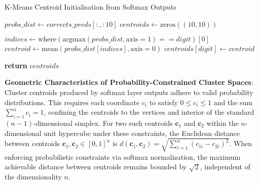 \begin{algorithm}
\caption{K-Means Centroid Initialisation from Softmax Outputs}
\label{alg:k-means-centroid-init} 
\begin{algorithmic}[1]

\State $probs\_dist \gets corrects\_preds[:, :10]$ 
\State $centroids \gets \text{zeros}((10, 10))$ 

\State $indices \gets \text{where}(\text{argmax}(probs\_dist, \text{axis}=1) == digit)[0]$ 
\State $centroid \gets \text{mean}(probs\_dist[indices], \text{axis}=0)$ 
\State $centroids[digit] \gets centroid$ 
\EndFor

\State \textbf{return} $centroids$
\end{algorithmic}
\end{algorithm}


\textbf{Geometric Characteristics of Probability-Constrained Cluster Spaces}: Cluster centroids produced by  softmax layer outputs adhere to valid probability distributions. This requires each coordinate \( c_i \) to satisfy \( 0 \leq c_i \leq 1 \) and the sum \( \sum_{i=1}^n c_i = 1 \), confining the centroids to the vertices and interior of the standard \((n-1)\)-dimensional simplex. For two such centroids \( \mathbf{c}_1 \) and \( \mathbf{c}_2 \) within the \( n \)-dimensional unit hypercube under these constraints, the Euclidean distance between centroids \( \mathbf{c}_1, \mathbf{c}_2 \in [0,1]^n \) is \( d(\mathbf{c}_1, \mathbf{c}_2) = \sqrt{\sum_{i=1}^{n}\left(c_{1i} - c_{2i}\right)^2} \). When enforcing probabilistic constraints via softmax normalization, the maximum achievable distance between centroids remains bounded by \(\sqrt{2}\), independent of the dimensionality \( n \).


